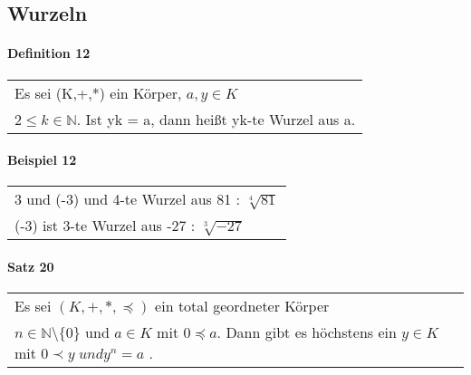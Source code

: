 \documentclass[a4paper]{scrartcl}
\begin{document}
\subsection{Wurzeln}

\paragraph{Definition 12}
\begin{tabbing}
\begin{tabular}{l}
Es sei (K,+,*) ein Körper, $a,y\in K$\\
$ 2 \leq k \in \mathbb{N} $. Ist yk = a, dann heißt yk-te Wurzel aus a.\\
\end{tabular}
\end{tabbing}

\paragraph{Beispiel 12}
\begin{tabbing}
\begin{tabular}{l}
3 und (-3) und 4-te Wurzel aus 81 : $\sqrt[4]{81}$\\
(-3) ist 3-te Wurzel aus -27 : $\sqrt[3]{-27}$
\end{tabular}
\end{tabbing}

\paragraph{Satz 20}
\begin{tabbing}
\begin{tabular}{l}
Es sei $(K,+,*,\preceq)$ ein total geordneter Körper \\
$ n\in \mathbb{N} \setminus \{ 0\} $ und $a\in K$ mit $ 0 \preceq a$.
Dann gibt es höchstens ein $y\in K$ mit $0 \prec y \; und y^n = a$ .\\
\end{tabular}
\end{tabbing}
\end{document}
